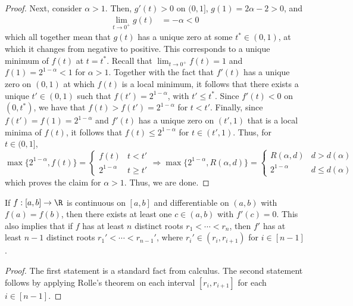 \documentclass[11pt]{article}
\begin{document}
\begin{proof}
    Next, consider $\alpha>1$. Then, $g'(t)>0$ on $(0,1]$, $g(1)=2\alpha-2>0$, and 
    \begin{align*}
        \lim_{t\to 0^+}g(t)&=-\alpha<0
    \end{align*}
    which all together mean that $g(t)$ has a unique zero at some $t^*\in (0,1)$, at which it changes from negative to positive. This corresponds to a unique minimum of $f(t)$ at $t=t^*$. Recall that $\lim_{t\to 0^+}f(t)=1$ and $f(1)=2^{1-\alpha}<1 $ for $\alpha > 1$. Together with the fact that $f'(t)$ has a unique zero on $(0,1)$ at which $f(t)$ is a local minimum, it follows that there exists a unique $t'\in (0,1)$ such that $f(t')=2^{1-\alpha}$, with $t'\leq t^*$. Since $f'(t)<0$ on $(0,t^*)$, we have that $f(t)>f(t')=2^{1-\alpha}$ for $t<t'$. Finally, since $f(t')=f(1)=2^{1-\alpha}$ and $f'(t)$ has a unique zero on $(t',1)$ that is a local minima of $f(t)$, it follows that $f(t)\leq 2^{1-\alpha}$ for $t\in (t',1)$. Thus, for $t\in (0,1]$,
     $$\max\{2^{1-\alpha},f(t)\}=\begin{cases}
        f(t)& t < t'\\
        2^{1-\alpha} & t \geq  t'
    \end{cases}\Rightarrow \max\{2^{1-\alpha},R(\alpha,d)\}=\begin{cases}
        R(\alpha,d) & d > d(\alpha)\\
        2^{1-\alpha} & d \leq d(\alpha)
    \end{cases}$$
    which proves the claim for $\alpha > 1$. Thus, we are done.
\end{proof}

\begin{lemma}\label{lemma:rolle}
   If $f:[a,b]\to \R$ is continuous on $[a,b]$ and differentiable on $(a,b)$ with $f(a)=f(b)$, then there exists at least one $c\in (a,b)$ with $f'(c)=0$. This also implies that if $f$ has at least $n$ distinct roots $r_1< \cdots<r_n$, then $f'$ has at least $n-1$ distinct roots $r_1'<\cdots<r_{n-1}'$, where $r_i'\in (r_i,r_{i+1})$ for $i\in [n-1]$. 
\end{lemma}
\begin{proof}
   The first statement is a standard fact from calculus. The second statement follows by applying Rolle's theorem on each interval $[r_i,r_{i+1}]$ for each $i\in [n-1]$. 
\end{proof}
\end{document}
